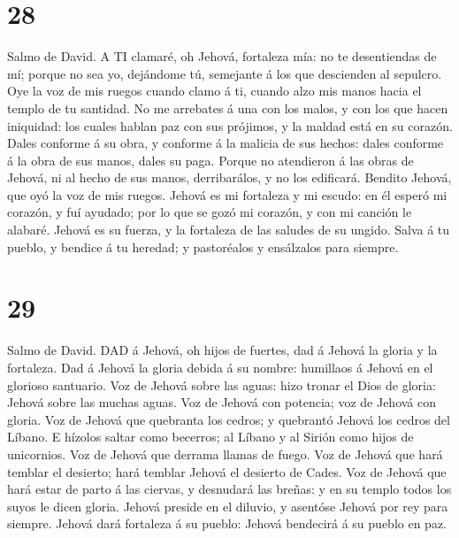 \hypertarget{section-27}{%
\section{28}\label{section-27}}

 Salmo de David. A TI clamaré, oh Jehová, fortaleza mía: no
te desentiendas de mí; porque no sea yo, dejándome tú, semejante á los
que descienden al sepulcro.  Oye la voz de mis ruegos cuando
clamo á ti, cuando alzo mis manos hacia el templo de tu santidad.
 No me arrebates á una con los malos, y con los que hacen
iniquidad: los cuales hablan paz con sus prójimos, y la maldad está en
su corazón.  Dales conforme á su obra, y conforme á la
malicia de sus hechos: dales conforme á la obra de sus manos, dales su
paga.  Porque no atendieron á las obras de Jehová, ni al
hecho de sus manos, derribarálos, y no los edificará. 
Bendito Jehová, que oyó la voz de mis ruegos.  Jehová es mi
fortaleza y mi escudo: en él esperó mi corazón, y fuí ayudado; por lo
que se gozó mi corazón, y con mi canción le alabaré.  Jehová
es su fuerza, y la fortaleza de las saludes de su ungido. 
Salva á tu pueblo, y bendice á tu heredad; y pastoréalos y ensálzalos
para siempre.

\hypertarget{section-28}{%
\section{29}\label{section-28}}

 Salmo de David. DAD á Jehová, oh hijos de fuertes, dad á
Jehová la gloria y la fortaleza.  Dad á Jehová la gloria
debida á su nombre: humillaos á Jehová en el glorioso santuario.
 Voz de Jehová sobre las aguas: hizo tronar el Dios de
gloria: Jehová sobre las muchas aguas.  Voz de Jehová con
potencia; voz de Jehová con gloria.  Voz de Jehová que
quebranta los cedros; y quebrantó Jehová los cedros del Líbano.
 E hízolos saltar como becerros; al Líbano y al Sirión como
hijos de unicornios.  Voz de Jehová que derrama llamas de
fuego.  Voz de Jehová que hará temblar el desierto; hará
temblar Jehová el desierto de Cades.  Voz de Jehová que hará
estar de parto á las ciervas, y desnudará las breñas: y en su templo
todos los suyos le dicen gloria.  Jehová preside en el
diluvio, y asentóse Jehová por rey para siempre.  Jehová
dará fortaleza á su pueblo: Jehová bendecirá á su pueblo en paz.


